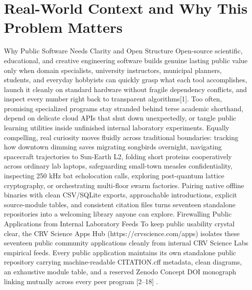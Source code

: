 \documentclass[10pt,letterpaper]{article}
\begin{document}
\section{Real-World Context and Why This Problem Matters}
Why Public Software Needs Clarity and Open Structure Open-source scientific, educational, and creative engineering software builds genuine lasting public value only when domain specialists, university instructors, municipal planners, students, and everyday hobbyists can quickly grasp what each tool accomplishes, launch it cleanly on standard hardware without fragile dependency conflicts, and inspect every number right back to transparent algorithms[1]. Too often, promising specialized programs stay stranded behind terse academic shorthand, depend on delicate cloud APIs that shut down unexpectedly, or tangle public learning utilities inside unfinished internal laboratory experiments. Equally compelling, real curiosity moves fluidly across traditional boundaries: tracking how downtown dimming saves migrating songbirds overnight, navigating spacecraft trajectories to Sun-Earth L2, folding short proteins cooperatively across ordinary lab laptops, safeguarding small-town measles confidentiality, inspecting 250 kHz bat echolocation calls, exploring post-quantum lattice cryptography, or orchestrating multi-floor swarm factories. Pairing native offline binaries with clean CSV/SQLite exports, approachable introductions, explicit source-module tables, and consistent citation files turns seventeen standalone repositories into a welcoming library anyone can explore. Firewalling Public Applications from Internal Laboratory Feeds To keep public usability crystal clear, the CRV Science Apps Hub (https://crvscience.com/apps) isolates these seventeen public community applications cleanly from internal CRV Science Labs empirical feeds. Every public application maintains its own standalone public repository carrying machine-readable CITATION.cff metadata, clean diagrams, an exhaustive module table, and a reserved Zenodo Concept DOI monograph linking mutually across every peer program [2--18] .
\end{document}
